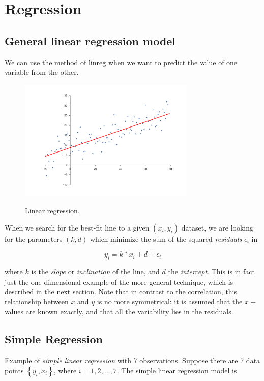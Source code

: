 
\section{Regression} 

\subsection{General linear regression model}

We can use the method of \gls{linreg} when we want to predict the value of one variable from the other.

\begin{figure}
  \centering
  \includegraphics[width=0.75\textwidth]{../Images/Linear_regression.png}\\
  \caption{Linear regression.}\label{fig:regression}
\end{figure}

When we search for the best-fit line to a given $(x_i,y_i)$ dataset, we are looking for the parameters $(k,d)$ which minimize the sum of the squared \emph{residuals} $\epsilon_i$ in

\begin{equation}\label{eq:simpleRegression}
  y_i = k * x_i + d + \epsilon_i
\end{equation}

where $k$ is the \emph{slope} or \emph{inclination} of the line, and $d$ the \emph{intercept}. This is in fact just the one-dimensional example of the more general technique, which is described in the next section.
Note that in contrast to the correlation, this relationship between $x$ and $y$ is no more symmetrical: it is assumed that the $x-$values are known exactly, and that all the variability lies in the residuals.

\subsection{Simple Regression}
Example of \emph{simple linear regression} with 7 observations.
Suppose there are 7 data points $\left\{ {{y_i},{x_i}} \right\}$, where $i=1,2,…,7$. The simple linear regression model is

